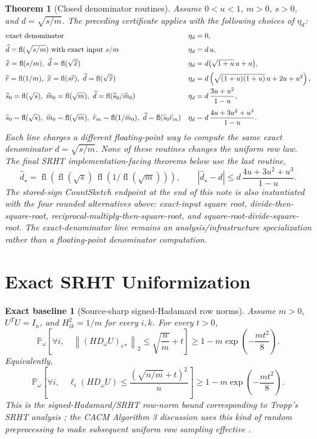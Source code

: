 \documentclass[11pt]{article}
\newcommand{\Prob}{\mathbb{P}}
\newcommand{\Norm}[1]{\left\lVert #1\right\rVert_2}
\newcommand{\fl}{\operatorname{fl}}
\newcommand{\I}{I}
\newtheorem{theorem}{Theorem}
\newtheorem*{baseline}{Exact baseline}
\theoremstyle{remark}
\begin{document}
\begin{theorem}[Closed denominator routines]
Assume \(0<u<1\), \(m>0\), \(s>0\), and \(d=\sqrt{s/m}\).  The preceding
certificate applies with the following choices of \(\eta_d\):
\[
\begin{array}{@{}ll@{}}
\text{exact denominator} &
  \eta_d=0,\\[2mm]
\widehat d=\fl(\sqrt{s/m})\text{ with exact input }s/m &
  \eta_d=d\,u,\\[2mm]
\widehat x=\fl(s/m),\ \widehat d=\fl(\sqrt{\widehat x}) &
  \eta_d=d\bigl(\sqrt{1+u}\,u+u\bigr),\\[2mm]
\widehat r=\fl(1/m),\ \widehat x=\fl(s\widehat r),\
  \widehat d=\fl(\sqrt{\widehat x}) &
  \eta_d=d\left(\sqrt{(1+u)(1+u)}\,u+2u+u^2\right),\\[2mm]
\widehat s_0=\fl(\sqrt{s}),\ \widehat m_0=\fl(\sqrt{m}),\
  \widehat d=\fl(\widehat s_0/\widehat m_0) &
  \eta_d=d\,\dfrac{3u+u^2}{1-u},\\[4mm]
\widehat s_0=\fl(\sqrt{s}),\ \widehat m_0=\fl(\sqrt{m}),\
  \widehat r_m=\fl(1/\widehat m_0),\
  \widehat d=\fl(\widehat s_0\widehat r_m) &
  \eta_d=d\,\dfrac{4u+3u^2+u^3}{1-u}.
\end{array}
\]
Each line charges a different floating-point way to compute the same exact
denominator \(d=\sqrt{s/m}\).  None of these routines changes the uniform row
law.
The final SRHT implementation-facing theorems below use the last routine,
\[
  \widehat d_\star
  =
  \fl\!\left(
    \fl(\sqrt{s})\,\fl(1/\fl(\sqrt m))
  \right),
  \qquad
  |\widehat d_\star-d|
  \le
  d\,\frac{4u+3u^2+u^3}{1-u}.
\]
The stored-sign CountSketch endpoint at the end of this note is also
instantiated with the four rounded alternatives above: exact-input square
root, divide-then-square-root, reciprocal-multiply-then-square-root, and
square-root-divide-square-root.  The exact-denominator line remains an
analysis/infrastructure specialization rather than a floating-point
denominator computation.
\end{theorem}

\section*{Exact SRHT Uniformization}

\begin{baseline}[Source-sharp signed-Hadamard row norms]
Assume \(m>0\), \(U^TU=\I_n\), and \(H_{ik}^2=1/m\) for every \(i,k\).
For every \(t>0\),
\[
  \Prob_\omega\!\left[
    \forall i,\quad
    \Norm{(HD_\omega U)_{i*}}\le
    \sqrt{\frac nm}+t
  \right]
  \ge
  1-m\exp\!\left(-\frac{mt^2}{8}\right).
\]
Equivalently,
\[
  \Prob_\omega\!\left[
    \forall i,\quad
    \ell_i(HD_\omega U)\le
    \frac{(\sqrt{n/m}+t)^2}{n}
  \right]
  \ge
  1-m\exp\!\left(-\frac{mt^2}{8}\right).
\]
This is the signed-Hadamard/SRHT row-norm bound corresponding to Tropp's SRHT
analysis \cite{Tropp2011SRHT}; the CACM Algorithm 3 discussion uses this kind
of random preprocessing to make subsequent uniform row sampling effective
\cite{DrineasMahoney2016RandNLA}.
\end{baseline}
\end{document}
